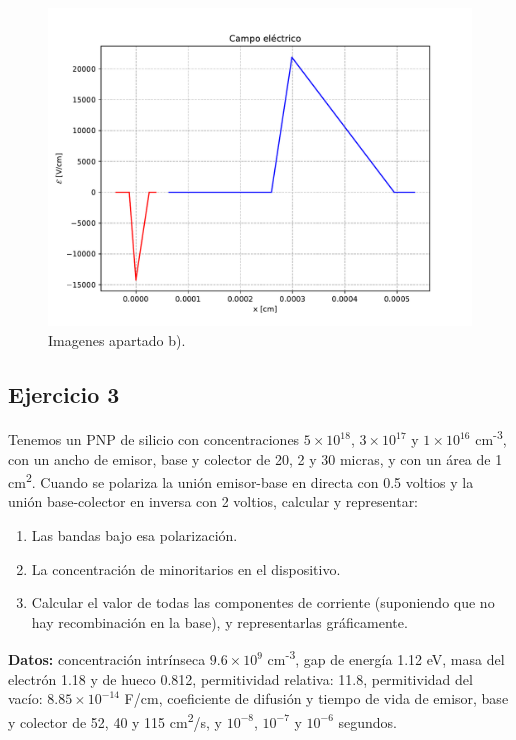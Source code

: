 \begin{enumerate}[label=\alph*)]
\begin{figure}[h!]
        \includegraphics[width=0.48\linewidth]{Ejercicios/Ch_04/04_Ejercicio-2-04.pdf}
        \caption{Imagenes apartado b).}
    \end{figure}

\end{enumerate}
\vspace*{2em}


\begin{Enunciado}
\subsection*{Ejercicio 3}


Tenemos un PNP de silicio con concentraciones $5 \times 10^{18}$, $3 \times 10^{17}$ y $1 \times 10^{16}$ cm\textsuperscript{-3}, con un ancho de emisor, base y colector de 20, 2 y 30 micras, y con un área de 1 cm\textsuperscript{2}. Cuando se polariza la unión emisor-base en directa con 0.5 voltios y la unión base-colector en inversa con 2 voltios, calcular y representar:
\begin{enumerate}[label=\alph*)]
    \item Las bandas bajo esa polarización.
    \item La concentración de minoritarios en el dispositivo.
    \item Calcular el valor de todas las componentes de corriente (suponiendo que no hay recombinación en la base), y representarlas gráficamente.
\end{enumerate}
\textbf{Datos:} concentración intrínseca $9.6 \times 10^9$ cm\textsuperscript{-3}, gap de energía 1.12 eV, masa del electrón 1.18 y de hueco 0.812, permitividad relativa: 11.8, permitividad del vacío: $8.85 \times 10^{-14}$ F/cm, coeficiente de difusión y tiempo de vida de emisor, base y colector de 52, 40 y 115 cm\textsuperscript{2}/s, y $10^{-8}$, $10^{-7}$ y $10^{-6}$ segundos.
\end{Enunciado}

